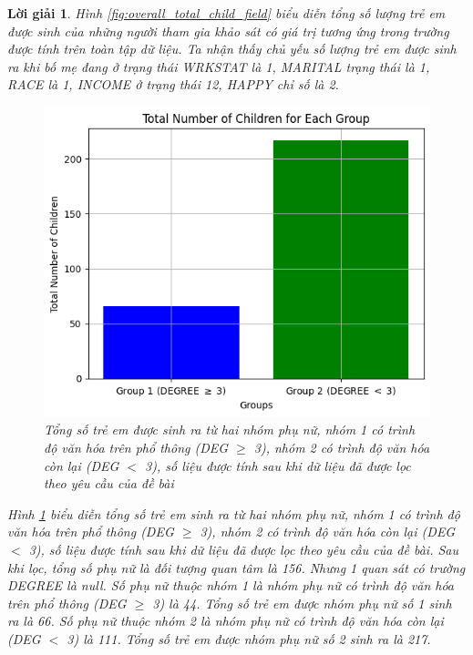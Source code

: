 \documentclass[14pt, a4paper]{article}
\theoremstyle{sltheorem}
\theoremstyle{soltheorem}
\newtheorem*{loigiai}{Lời giải}
\begin{document}
\begin{loigiai}
    Hình \ref{fig:overall_total_child_field} biểu diễn tổng số lượng trẻ em được sinh của những người tham gia khảo sát có giá trị tương ứng trong trường được tính trên toàn tập dữ liệu.
    Ta nhận thấy chủ yếu số lượng trẻ em được sinh ra khi bố mẹ đang ở trạng thái WRKSTAT là 1, MARITAL trạng thái là 1, RACE là 1, INCOME ở trạng thái 12, HAPPY chỉ số là 2.

    \begin{figure}[H]
        \centering
        \includegraphics[width=0.5\linewidth]{figures/considered_total_child_each_women_group.png}
        \caption{Tổng số trẻ em được sinh ra từ hai nhóm phụ nữ, nhóm 1 có trình độ văn hóa trên phổ thông (DEG $\geq$ 3), nhóm 2 có trình độ văn hóa còn lại (DEG $<$ 3), số liệu được tính sau khi dữ liệu đã được lọc theo yêu cầu của đề bài}
        \label{fig:considered_total_child_each_women_group}
    \end{figure}

    Hình \ref{fig:considered_total_child_each_women_group} biểu diễn tổng số trẻ em sinh ra từ hai nhóm phụ nữ, nhóm 1 có trình độ văn hóa trên phổ thông (DEG $\geq$ 3), nhóm 2 có trình độ văn hóa còn lại (DEG $<$ 3), số liệu được tính sau khi dữ liệu đã được lọc theo yêu cầu của đề bài.
    Sau khi lọc, tổng số phụ nữ là đối tượng quan tâm là 156.
    Nhưng 1 quan sát có trường DEGREE là null.
    Số phụ nữ thuộc nhóm 1 là nhóm phụ nữ có trình độ văn hóa trên phổ thông (DEG $\geq$ 3) là 44.
    Tổng số trẻ em được nhóm phụ nữ số 1 sinh ra là 66.
    Số phụ nữ thuộc nhóm 2 là nhóm phụ nữ có trình độ văn hóa còn lại (DEG $<$ 3) là 111.
    Tổng số trẻ em được nhóm phụ nữ số 2 sinh ra là 217.


\end{loigiai}
\end{document}
